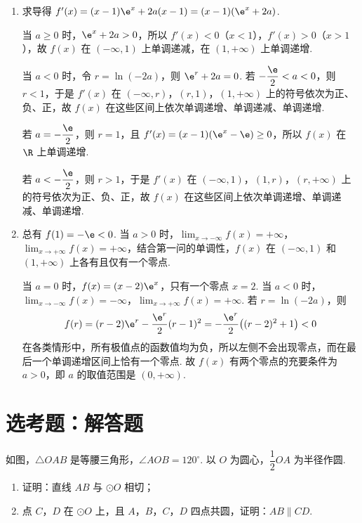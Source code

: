 \begin{solution}
\begin{enumerate}
\item 求导得 \(f'(x)=(x-1)\e^x+2a(x-1)=(x-1)(\e^x+2a)\).

当 \(a\ge0\) 时，\(\e^x+2a>0\)，所以 \(f'(x)<0\)（\(x<1\)），\(f'(x)>0\)（\(x>1\)），故 \(f(x)\) 在 \((-\infty,1)\) 上单调递减，在 \((1,+\infty)\) 上单调递增.

当 \(a<0\) 时，令 \(r=\ln(-2a)\)，则 \(\e^r+2a=0\). 若 \(-\dfrac\e2<a<0\)，则 \(r<1\)，于是 \(f'(x)\) 在 \((-\infty,r)\)，\((r,1)\)，\((1,+\infty)\) 上的符号依次为正、负、正，故 \(f(x)\) 在这些区间上依次单调递增、单调递减、单调递增.

若 \(a=-\dfrac\e2\)，则 \(r=1\)，且 \(f'(x)=(x-1)(\e^x-\e)\ge0\)，所以 \(f(x)\) 在 \(\R\) 上单调递增.

若 \(a<-\dfrac\e2\)，则 \(r>1\)，于是 \(f'(x)\) 在 \((-\infty,1)\)，\((1,r)\)，\((r,+\infty)\) 上的符号依次为正、负、正，故 \(f(x)\) 在这些区间上依次单调递增、单调递减、单调递增.
\item 总有 \(f(1)=-\e<0\). 当 \(a>0\) 时，\(\lim_{x\to-\infty}f(x)=+\infty\)，\(\lim_{x\to+\infty}f(x)=+\infty\)，结合第一问的单调性，\(f(x)\) 在 \((-\infty,1)\) 和 \((1,+\infty)\) 上各有且仅有一个零点.

当 \(a=0\) 时，\(f(x)=(x-2)\e^x\)，只有一个零点 \(x=2\). 当 \(a<0\) 时，\(\lim_{x\to-\infty}f(x)=-\infty\)，\(\lim_{x\to+\infty}f(x)=+\infty\). 若 \(r=\ln(-2a)\)，则
\[
f(r)=(r-2)\e^r-\frac{\e^r}{2}(r-1)^2=-\frac{\e^r}{2}\bigl((r-2)^2+1\bigr)<0
\]
在各类情形中，所有极值点的函数值均为负，所以左侧不会出现零点，而在最后一个单调递增区间上恰有一个零点. 故 \(f(x)\) 有两个零点的充要条件为 \(a>0\)，即 \(a\) 的取值范围是 \((0,+\infty)\).
\end{enumerate}
\end{solution}

\section{选考题：解答题}

\begin{problem}
如图，\(\triangle OAB\) 是等腰三角形，\(\angle AOB=120^\circ\). 以 \(O\) 为圆心，\(\dfrac12 OA\) 为半径作圆.

\begin{enumerate}
\item 证明：直线 \(AB\) 与 \(\odot O\) 相切；
\item 点 \(C\)，\(D\) 在 \(\odot O\) 上，且 \(A\)，\(B\)，\(C\)，\(D\) 四点共圆，证明：\(AB\parallel CD\).
\end{enumerate}

\end{problem}

